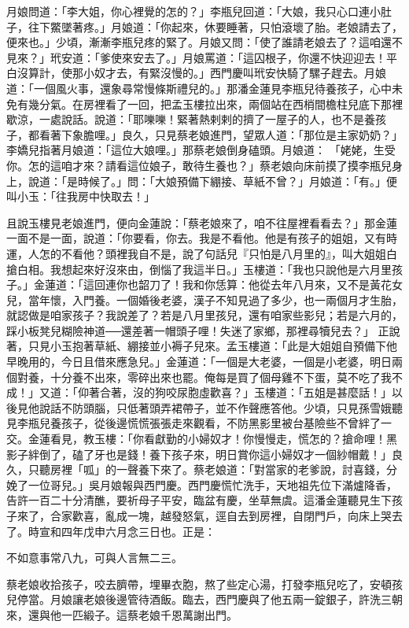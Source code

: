 月娘問道：「李大姐，你心裡覺的怎的？」李瓶兒回道：「大娘，我只心口連小肚子，往下鱉墜著疼。」月娘道：「你起來，休要睡著，只怕滾壞了胎。老娘請去了，便來也。」少頃，漸漸李瓶兒疼的緊了。月娘又問：「使了誰請老娘去了？這咱還不見來？」玳安道：「爹使來安去了。」月娘罵道：「這囚根子，你還不快迎迎去！平白沒算計，使那小奴才去，有緊沒慢的。」西門慶叫玳安快騎了騾子趕去。月娘道：「一個風火事，還象尋常慢條斯禮兒的。」那潘金蓮見李瓶兒待養孩子，心中未免有幾分氣。在房裡看了一回，把孟玉樓拉出來，兩個站在西梢間檐柱兒底下那裡歇涼，一處說話。說道：「耶嚛嚛！緊著熱剌剌的擠了一屋子的人，也不是養孩子，都看著下象膽哩。」良久，只見蔡老娘進門，望眾人道：「那位是主家奶奶？」李嬌兒指著月娘道：「這位大娘哩。」那蔡老娘倒身磕頭。月娘道： 「姥姥，生受你。怎的這咱才來？請看這位娘子，敢待生養也？」蔡老娘向床前摸了摸李瓶兒身上，說道：「是時候了。」問：「大娘預備下綳接、草紙不曾？」月娘道：「有。」便叫小玉：「往我房中快取去！」

且說玉樓見老娘進門，便向金蓮說：「蔡老娘來了，咱不往屋裡看看去？」那金蓮一面不是一面，說道：「你要看，你去。我是不看他。他是有孩子的姐姐，又有時運，人怎的不看他？頭裡我自不是，說了句話兒『只怕是八月里的』，叫大姐姐白搶白相。我想起來好沒來由，倒惱了我這半日。」玉樓道：「我也只說他是六月里孩子。」金蓮道：「這回連你也韶刀了！我和你恁算：他從去年八月來，又不是黃花女兒，當年懷，入門養。一個婚後老婆，漢子不知見過了多少，也一兩個月才生胎，就認做是咱家孩子？我說差了？若是八月里孩兒，還有咱家些影兒；若是六月的，踩小板凳兒糊險神道──還差著一帽頭子哩！失迷了家鄉，那裡尋犢兒去？」 正說著，只見小玉抱著草紙、綳接並小褥子兒來。孟玉樓道：「此是大姐姐自預備下他早晚用的，今日且借來應急兒。」金蓮道：「一個是大老婆，一個是小老婆，明日兩個對養，十分養不出來，零碎出來也罷。俺每是買了個母雞不下蛋，莫不吃了我不成！」又道：「仰著合著，沒的狗咬尿胞虛歡喜？」玉樓道：「五姐是甚麼話！」以後見他說話不防頭腦，只低著頭弄裙帶子，並不作聲應答他。少頃，只見孫雪娥聽見李瓶兒養孩子，從後邊慌慌張張走來觀看，不防黑影里被台基險些不曾絆了一交。金蓮看見，教玉樓：「你看獻勤的小婦奴才！你慢慢走，慌怎的？搶命哩！黑影子絆倒了，磕了牙也是錢！養下孩子來，明日賞你這小婦奴才一個紗帽戴！」良久，只聽房裡「呱」的一聲養下來了。蔡老娘道：「對當家的老爹說，討喜錢，分娩了一位哥兒。」吳月娘報與西門慶。西門慶慌忙洗手，天地祖先位下滿爐降香，告許一百二十分清醮，要祈母子平安，臨盆有慶，坐草無虞。這潘金蓮聽見生下孩子來了，合家歡喜，亂成一塊，越發怒氣，逕自去到房裡，自閉門戶，向床上哭去了。時宣和四年戊申六月念三日也。正是：

不如意事常八九，可與人言無二三。

蔡老娘收拾孩子，咬去臍帶，埋畢衣胞，熬了些定心湯，打發李瓶兒吃了，安頓孩兒停當。月娘讓老娘後邊管待酒飯。臨去，西門慶與了他五兩一錠銀子，許洗三朝來，還與他一匹緞子。這蔡老娘千恩萬謝出門。

